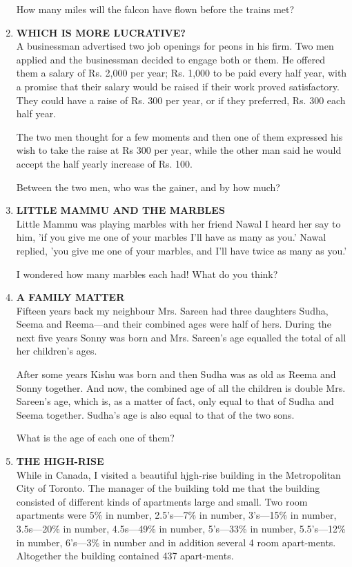 \documentclass[12pt]{article}
\begin{document}
\begin{enumerate}
How  many  miles  will the falcon  have  flown  before  the trains  met? 

\item \textbf{WHICH  IS MORE  LUCRATIVE?} \\ 
A businessman  advertised  two  job openings  for peons  in his firm.  Two  men  applied  and the businessman  decided to engage  both  or them.  He  offered  them  a salary  of Rs. 2,000  per  year;  Rs. 1,000  to be paid  every  half  year,  with a promise  that  their  salary  would  be raised  if their  work proved  satisfactory.  They  could  have  a raise  of Rs. 300 per year,  or if they  preferred,  Rs.  300  each  half year. 

The two  men  thought  for  a few  moments  and then one of them  expressed  his wish  to take  the  raise  at Rs 300 per  year,  while  the  other  man  said  he would  accept the half yearly  increase  of Rs. 100. 

Between  the two men,  who  was the gainer,  and by how much? 
%
\item \textbf{LITTLE  MAMMU  AND  THE  MARBLES} \\
Little  Mammu  was  playing  marbles  with  her friend  Nawal I heard  her say to him,  'if you give  me one of your  marbles I'll have  as many  as you.'  Nawal  replied,  'you  give  me one of your  marbles,  and  I'll  have  twice  as many as you.' 

I wondered  how  many  marbles  each  had!  What  do you think? 
%
\item \textbf{A FAMILY  MATTER} \\
Fifteen  years  back  my neighbour  Mrs.  Sareen  had  three daughters  Sudha,  Seema  and Reema—and  their  combined ages were  half of hers.  During  the  next  five years  Sonny was born  and Mrs.  Sareen's  age equalled  the total  of all her children's  ages. 

After  some  years  Kishu  was  born  and then  Sudha  was as old  as Reema  and  Sonny  together.  And  now,  the combined  age of all the children  is double  Mrs.  Sareen's age, which  is, as a matter  of fact,  only  equal  to that  of Sudha  and Seema  together.  Sudha's  age is also  equal  to that of the two sons. 

What  is the age of each  one of them? 
%
\item \textbf{THE  HIGH-RISE} \\
While  in Canada,  I visited  a beautiful  hjgh-rise  building in the  Metropolitan  City  of Toronto.  The  manager of the  building  told  me  that  the  building  consisted  of different  kinds  of apartments  large  and small.  Two  room apartments  were  5\%  in number,  2.5's—7\%  in number, 3's—15\%  in number,  3.5s—20\%  in number,  4.5s—49\% in number,  5's—33\%  in number,  5.5's—12\%  in number, 6's—3\%  in number  and in addition  several  4 room  apart-ments.  Altogether  the  building  contained  437  apart-ments. 


\end{enumerate}
\end{document}
